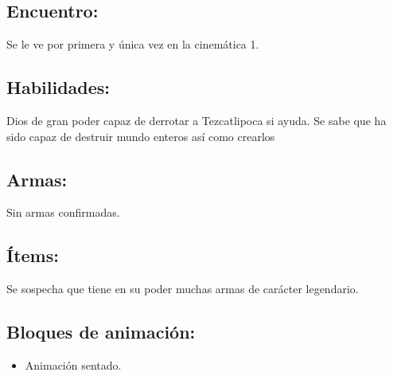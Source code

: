 \subsection{Encuentro:}
Se le ve por primera y única vez en la cinemática 1.
\subsection{Habilidades:}
Dios de gran poder capaz de derrotar a Tezcatlipoca si ayuda. Se sabe que ha sido capaz de destruir mundo enteros así como crearlos
\subsection{Armas:}
Sin armas confirmadas.
\subsection{Ítems:}
Se sospecha que tiene en su poder muchas armas de carácter legendario.
\subsection{Bloques de animación:}
	\begin{itemize}
		\item Animación sentado.
	\end{itemize}